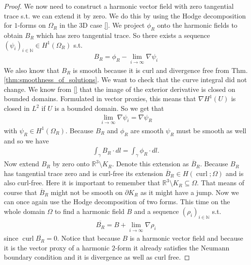 \documentclass[12pt,a4paper]{article}
\numberwithin{equation}{subsection}
\numberwithin{lemma}{subsection}
\theoremstyle{definition}
\DeclareMathOperator{\curl}{curl}
\newcommand{\naturalnum}{\mathbb{N}}
\newcommand{\real}{\mathbb{R}}
\begin{document}
\begin{proof}
    We now need to construct a harmonic vector field with zero tangential trace
    s.t. we can extend it by zero. We do this by using the Hodge 
    decomposition for $1$-forms on $\Omega_R$ in the $3$D case \ref{}.
    We project $\phi_R$ onto the harmonic fields to obtain $B_R$ which has zero 
    tangential trace. So there exists a sequence 
    $(\psi_i)_{i \in \naturalnum} \in H^1(\Omega_R)$ s.t.
    \begin{align*}
        B_R = \phi_R - \lim\limits_{i\rightarrow \infty}\nabla \psi_i
    \end{align*}
    We also know that $B_R$ is smooth because 
    it is curl and divergence free from Thm.\ref{thm:smoothness_of_solutions}. 
    We want to check that the curve
    integral did not change. We know from \ref{} that the 
    image of the exterior derivative is closed on bounded domains. 
    Formulated in vector proxies, this
    means that $\nabla H^1(U)$ is closed in $L^2$ if $U$ is a bounded domain. 
    So we get that 
    \begin{align*}
        \lim\limits_{i\rightarrow \infty}\nabla \psi_i = \nabla \psi_R
    \end{align*}
    with $\psi_R \in H^1(\Omega_R)$. Because $B_R$ and $\phi_R$ are smooth
    $\psi_R$ must be smooth as well and so we have   
    \begin{align*}
        \int_\gamma B_R\cdot dl = \int_\gamma \phi_R\cdot dl.
    \end{align*}
    Now extend $B_R$ by zero onto $\real^3 \setminus K_R$.
    Denote this extension as $\overline{B}_R$.
    Because $B_R$ has tangential trace zero and is curl-free its extension 
    $\overline{B}_R \in H(\curl;\Omega)$ and is also curl-free. 
    Here it is important to remember 
    that $\real^3 \setminus K_R \subseteq \Omega$. 
    That means of course that $\overline{B}_R$ 
    might not be smooth on $\partial K_R$ 
    as it might have a jump. 
    Now we can once again use the Hodge 
    decomposition of two forms. This time on the whole domain $\Omega$ to find 
    a harmonic field $B$ and a sequence $(\rho_i)_{i\in \naturalnum}$
    s.t.
    \begin{align*}
        \overline{B_R} = B 
            +\lim\limits_{i\rightarrow \infty}\nabla \rho_i
    \end{align*}
    since $\curl \overline{B_R} = 0$.
    Notice that because $B$ is a harmonic vector field 
    and because it is the vector 
    proxy of a harmonic $2$-form it already satisfies 
    the Neumann boundary condition and it is divergence as well as curl free.

\end{proof}
\end{document}
